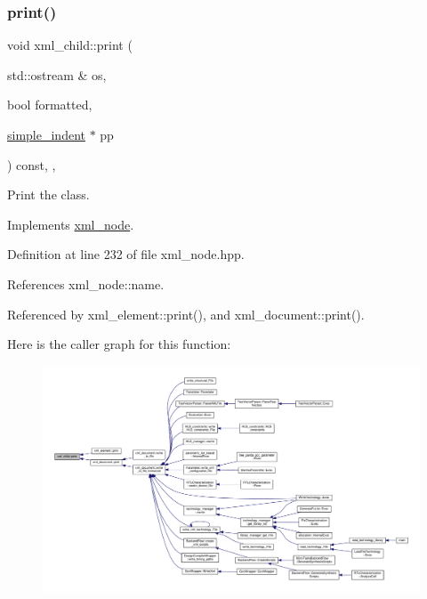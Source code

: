 \subsubsection{\texorpdfstring{print()}{print()}}
{\footnotesize\ttfamily void xml\+\_\+child\+::print (\begin{DoxyParamCaption}\item[{std\+::ostream \&}]{os,  }\item[{bool}]{formatted,  }\item[{\hyperlink{classsimple__indent}{simple\+\_\+indent} $\ast$}]{pp }\end{DoxyParamCaption}) const\hspace{0.3cm}{\ttfamily [inline]}, {\ttfamily [override]}, {\ttfamily [virtual]}}



Print the class. 



Implements \hyperlink{classxml__node_a150e224e18301e5842d10a5e47cc2661}{xml\+\_\+node}.



Definition at line 232 of file xml\+\_\+node.\+hpp.



References xml\+\_\+node\+::name.



Referenced by xml\+\_\+element\+::print(), and xml\+\_\+document\+::print().

Here is the caller graph for this function\+:
\nopagebreak
\begin{figure}[H]
\begin{center}
\leavevmode
\includegraphics[width=350pt]{d7/df9/classxml__child_a9a8f42eaeaec40f4cb26582da2bcf61d_icgraph}
\end{center}
\end{figure}
\mbox{\label{classxml__child_a78a291f569cf79849dc8b2649fc89608}} 
